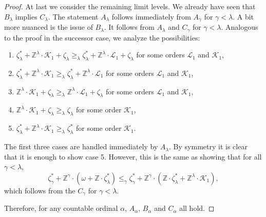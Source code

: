 \documentclass[10pt,a4paper]{amsart}
\newcommand{\K}{\mathcal{K}}
\renewcommand{\L}{\mathcal{L}}
\newcommand{\Z}{\mathbb{Z}}
\begin{document}
\begin{proof}
At last we consider the remaining limit levels. We already have seen that
$B_\lambda$ implies $C_\lambda$. The statement $A_\lambda$ follows immediately from $A_\gamma$ for $\gamma<\lambda$. 
A bit more nuanced is the issue of $B_\lambda$. It follows from $A_\lambda$ and $C_\gamma$ for $\gamma<\lambda$.
Analogous to the proof in the successor case, we analyze the possibilities:
\begin{enumerate}
\item $\zeta^*_{\lambda} +\Z^{\lambda}\cdot
    \K_1+\zeta_{\lambda}\geq_\lambda \zeta^*_{\lambda} +\Z^{\lambda}\cdot \L_1+\zeta_{\lambda} $ for some orders $\L_1$ and $\K_1$,
\item $\zeta^*_{\lambda} +\Z^{\lambda}\cdot \K_1\geq_\lambda \zeta^*_{\lambda} +\Z^{\lambda}\cdot \L_1 $ for some orders $\L_1$ and $\K_1$,
\item $\Z^{\lambda}\cdot \K_1+\zeta_{\lambda}\geq_\lambda \Z^{\lambda}\cdot \L_1+\zeta_{\lambda} $ for some orders $\L_1$ and $\K_1$,
\item $\Z^{\lambda}\cdot \K_1+\zeta_{\lambda}\geq_\lambda \zeta_{\lambda} $ for some order $\K_1$,
\item $\zeta^*_{\lambda} +\Z^{\lambda}\cdot \K_1\geq_\lambda\zeta^*_{\lambda} $ for some order $\K_1$.
\end{enumerate}

The first three cases are handled immediately by $A_{\lambda}$. By symmetry it is clear that it is enough to show case 5. However, this is the same as showing that for all $\gamma<\lambda$,
$$\zeta_{\gamma}^* + \Z^\gamma\cdot(\omega +  \Z\cdot\zeta_{\lambda}^*)
\leq_{\gamma}\zeta_{\gamma}^* + \Z^{\gamma}\cdot
(\Z\cdot\zeta_{\lambda}^*+\Z^\lambda\cdot \K_1),$$
which follows from the $C_\gamma$ for $\gamma<\lambda$.

Therefore, for any countable ordinal $\alpha$, $A_\alpha$, $B_\alpha$ and $C_\alpha$ all hold.
\end{proof}
\end{document}
